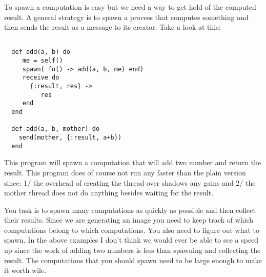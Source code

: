 \documentclass[a4paper,11pt]{article}
\begin{document}
To spawn a computation is easy but we need a way to get hold of the
computed result. A general strategy is to spawn a process that
computes something and then sends the result as a message to its
creator. Take a look at this:

\begin{verbatim}
  
  def add(a, b) do
     me = self()
     spawn( fn() -> add(a, b, me) end)
     receive do
       {:result, res} ->
          res
     end
  end

  def add(a, b, mother) do
    send(mother, {:result, a+b})
  end
\end{verbatim}

This program will spawn a computation that will add two number and
return the result. This program does of course not run any faster than
the plain version since: 1/ the overhead of creating the thread over
shadows any gains and 2/ the mother thread does not do anything
besides waiting for the result.

You task is to spawn many computations as quickly as possible and then
collect their results. Since we are generating an image you need to
keep track of which computations belong to which computations. You
also need to figure out what to spawn. In the above examples I don't
think we would ever be able to see a speed up since the work of adding
two numbers is less than spawning and collecting the result. The
computations that you should spawn need to be large enough to make it
worth wile.
\end{document}
